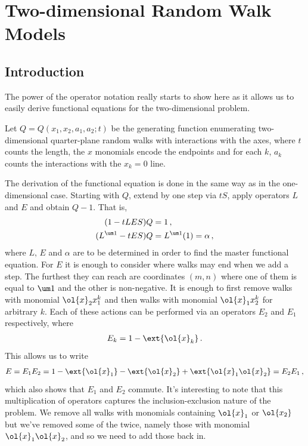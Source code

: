 
\chapter{Two-dimensional Random Walk Models}
\label{ch:2DWalks}
\section{Introduction}
The power of the operator notation really starts to show here as it allows us to easily derive functional equations for the two-dimensional problem.
\begin{definition} Let $Q = Q(x_1,x_2,a_1,a_2;t)$ be the generating function enumerating two-dimensional quarter-plane random walks with interactions with the axes, where $t$ counts the length, the $x$ monomials encode the endpoints and for each $k$, $a_k$ counts the interactions with the $x_k = 0$ line.
\end{definition}
The derivation of the functional equation is done in the same way as in the one-dimensional case. Starting with $Q$, extend by one step via $tS$, apply operators $L$ and $E$ and obtain $Q-1$. That is,
\begin{align}
	(1-tLES)Q &= 1\,,\\
	(L^{\um 1} - tES)Q &= L^{\um 1}(1) = \alpha\,,
\end{align}
where $L,\,E$ and $\alpha$ are to be determined in order to find the master functional equation. For $E$ it is enough to consider where walks may end when we add a step. The furthest they can reach are coordinates $(m,n)$ where one of them is equal to $\um 1$ and the other is non-negative. It is enough to first remove walks with monomial $\ol{x}_2x_1^k$ and then walks with monomial $\ol{x}_1x_2^k$ for arbitrary $k$. Each of these actions can be performed via an operators $E_2$ and $E_1$ respectively, where
\begin{align}
	E_k = 1 - \ext{\ol{x}_k}\,.
\end{align}
This allows us to write
\begin{align}
	E = E_1 E_2 = 1-\ext{\ol{x}_1}-\ext{\ol{x}_2}+\ext{\ol{x}_1\ol{x}_2} = E_2 E_1\,,
\end{align}
which also shows that $E_1$ and $E_2$ commute. It's interesting to note that this multiplication of operators captures the inclusion-exclusion nature of the problem. We remove all walks with monomials containing $\ol{x}_1$ or $\ol{x_2}$ but we've removed some of the twice, namely those with monomial $\ol{x}_1\ol{x}_2$, and so we need to add those back in.

